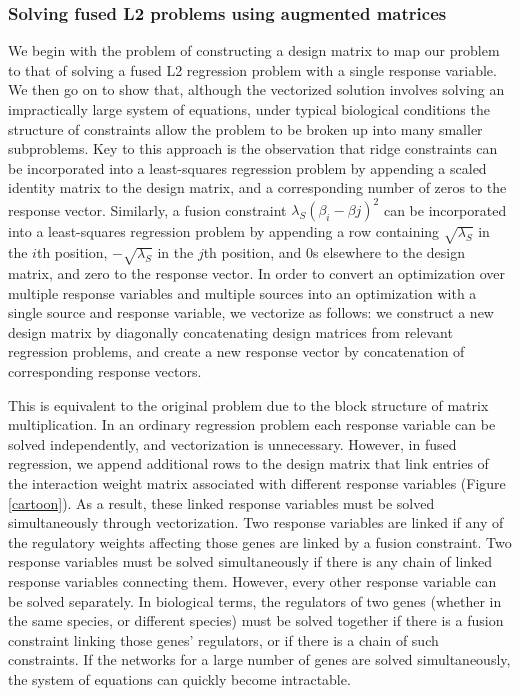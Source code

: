 \documentclass[11pt]{article}
\begin{document}
\subsubsection{Solving fused L2 problems using augmented matrices}
We begin with the problem of constructing a design matrix to map our problem to that of solving a fused L2 regression problem with a single response variable. 
We then go on to show that, although the vectorized solution involves solving an impractically large system of equations, under typical biological conditions the structure of constraints allow the problem to be broken up into many smaller subproblems. 
Key to this approach is the observation that ridge constraints can be incorporated into a least-squares regression problem by appending a scaled identity matrix to the design matrix, and a corresponding number of zeros to the response vector. 
Similarly, a fusion constraint $\lambda_S (\beta_{i} - \beta{j})^2$ can be incorporated into a least-squares regression problem by appending a row containing $\sqrt{\lambda_S}$ in the $i$th position, $-\sqrt{\lambda_S}$ in the $j$th position, and $0$s elsewhere to the design matrix, and zero to the response vector. 
In order to convert an optimization over multiple response variables and multiple sources into an optimization with a single source and response variable, we vectorize as follows: we construct a new design matrix by diagonally concatenating design matrices from relevant regression problems, and create a new response vector by concatenation of corresponding response vectors. 

This is equivalent to the original problem due to the block structure of matrix multiplication. 
In an ordinary regression problem each response variable can be solved independently, and vectorization is unnecessary. 
However, in fused regression, we append additional rows to the design matrix that link entries of the interaction weight matrix associated with different response variables (Figure \ref{cartoon}). 
As a result, these linked response variables must be solved simultaneously through vectorization. 
Two response variables are linked if any of the regulatory weights affecting those genes are linked by a fusion constraint. 
Two response variables must be solved simultaneously if there is any chain of linked response variables connecting them. 
However, every other response variable can be solved separately. 
In biological terms, the regulators of two genes (whether in the same species, or different species) must be solved together if there is a fusion constraint linking those genes' regulators, or if there is a chain of such constraints. 
If the networks for a large number of genes are solved simultaneously, the system of equations can quickly become intractable. 
\end{document}
